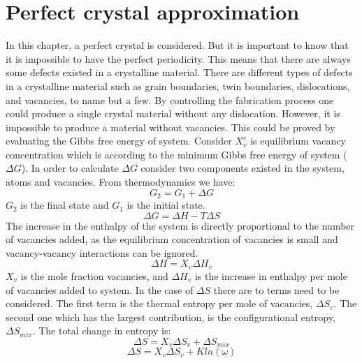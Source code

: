 \section{Perfect crystal approximation}
    In this chapter, a perfect crystal is considered. But it is important to know that it is impossible to have the perfect periodicity. This means that there are always some defects existed in a crystalline material. There are different types of defects in a crystalline material such as grain boundaries, twin boundaries, dislocations, and vacancies, to name but a few. By controlling the fabrication process one could produce a single crystal material without any dislocation. However, it is impossible to produce a material without vacancies. This could be proved by evaluating the Gibbs free energy of system. Consider $X_{v}^{e}$ is equilibrium vacancy concentration which is according to the minimum Gibbs free energy of system ($\Delta G$). In order to calculate $\Delta G$ consider two components existed in the system, atoms and vacancies. From thermodynamics we have:
    \begin{equation} \label{eq:Gibbs_1}
        G_{2} = G_{1} +\Delta G
    \end{equation}
    $G_{2}$ is the final state and $G_{1}$ is the initial state.
    \begin{equation} \label{eq:Gibbs_2}
        \Delta G = \Delta H - T\Delta S
    \end{equation}
    The increase in the enthalpy of the system is directly proportional to the number of vacancies added, as the equilibrium concentration of vacancies is small and vacancy-vacancy interactions can be ignored.
    \begin{equation*}
        \Delta H = X_{v}\Delta H_{v}
    \end{equation*}
    $X_{v}$ is the mole fraction vacancies, and $\Delta H_{v}$ is the increase in enthalpy per mole of vacancies added to system.\newline
    In the case of $\Delta S$ there are to terms need to be considered. The first term is the thermal entropy per mole of vacancies, $\Delta S_{v}$. The second one which has the largest contribution, is the configurational entropy, $\Delta S_{mix}$. The total change in entropy is:
    \begin{equation*}
        \Delta S = X_{v}\Delta S_{v} + \Delta S_{mix}
    \end{equation*}
    \begin{equation*}
        \Delta S = X_{v}\Delta S_{v} + Kln(\omega)
    \end{equation*}
